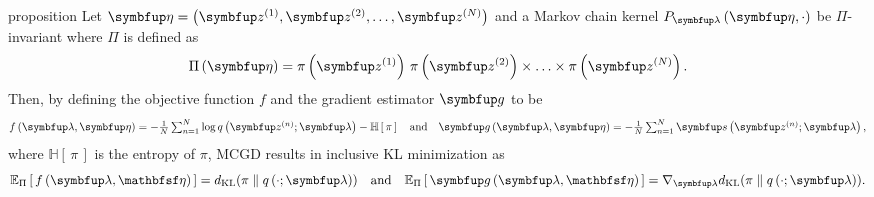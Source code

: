 
\begin{theoremEnd}{proposition}\label{thm:product_kernel}
  Let \(\veta = \left( \vz^{(1)}, \vz^{(2)}, \ldots, \vz^{(N)} \right)\) and a Markov chain kernel \(P_{\vlambda}\left(\veta, \cdot\right)\) be \(\Pi\)-invariant where \(\Pi\) is defined as
  {%
  \[
  \Pi\left(\veta\right) = \pi\left(\vz^{(1)}\right) \, \pi\left(\vz^{(2)}\right) \times \ldots \times \pi\left(\vz^{(N)}\right).
  \]
  }
  Then, by defining the objective function \(f\) and the gradient estimator \(\vg\) to be 
  {%
  \begin{align*}
    \textstyle
    f\left(\vlambda, \veta\right) =  -\frac{1}{N} \sum^{N}_{n=1} \log q\left(\vz^{(n)}; \vlambda\right) - \mathbb{H}\left[\,\pi\,\right] 
    \quad\text{and}\quad
    \vg\left(\vlambda, \veta\right) =  -\frac{1}{N} \sum^{N}_{n=1} \vs\left(\vz^{(n)}; \vlambda\right),
  \end{align*}
  }
  where \(\mathbb{H}\left[\,\pi\,\right]\) is the entropy of \(\pi\), MCGD results in inclusive KL minimization as
  {%
  \begin{align*}
    \Esub{\Pi}{ f\left(\vlambda, \rvveta\right) } = \DKL{\pi}{q\left(\cdot; \vlambda\right)}
    \quad\text{and}\quad
    \Esub{\Pi}{ \vg\left(\vlambda, \rvveta\right) } = \nabla_{\vlambda} \DKL{\pi}{q\left(\cdot; \vlambda\right)}.
  \end{align*}
  }
\end{theoremEnd}
